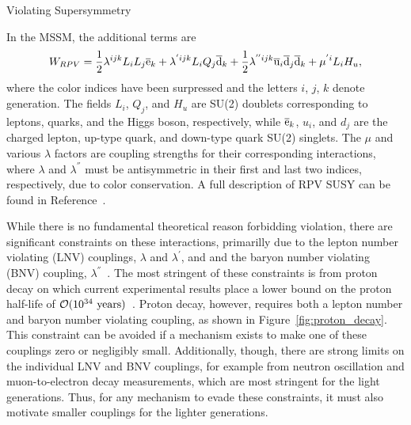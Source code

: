 \begin{section}{\RP Violating Supersymmetry}

In the MSSM, the additional \RPV terms are
\begin{align}
W_{RPV} = \frac{1}{2}\lambda^{ijk}L_{i}L_{j}\overline{\mathrm{e}}_{k} + \lambda^{'ijk}L_{i}Q_{j}\overline{\mathrm{d}}_{k} + \frac{1}{2}\lambda^{''ijk}\overline{\mathrm{u}}_{i}\overline{\mathrm{d}}_{j}\overline{\mathrm{d}}_{k} + \mu^{'i}L_{i}H_{u},
\end{align}
where the color indices have been surpressed and the letters $i$, $j$, $k$ denote generation.
The fields $L_{i}$, $Q_{j}$, and $H_u$ are SU(2) doublets corresponding to leptons, quarks, and the Higgs boson, respectively, while $\overline{\mathrm{e}}_k$, $u_i$, and $d_j$ are the charged lepton, up-type quark, and down-type quark SU(2) singlets.
The $\mu$ and various $\lambda$ factors are coupling strengths for their corresponding interactions, where $\lambda$ and $\lambda^{''}$ must be antisymmetric in their first and last two indices, respectively, due to color conservation.
A full description of RPV SUSY can be found in Reference~\cite{Barbier:2004ez}.

While there is no fundamental theoretical reason forbidding \RP violation, there are significant constraints on these interactions, primarilly due to the lepton number violating (LNV) couplings, $\lambda$ and $\lambda^{'}$, and and the baryon number violating (BNV) coupling, $\lambda^{''}$~\cite{Allanach:1999ic}.
The most stringent of these constraints is from proton decay on which current experimental results place a lower bound on the proton half-life of $\mathcal{O}(10^{34}\ \mrm{years})$~\cite{Bajc:2016qcc,Nishino:2009aa}.
Proton decay, however, requires both a lepton number and baryon number violating coupling, as shown in Figure~\ref{fig:proton_decay}.
This constraint can be avoided if a mechanism exists to make one of these couplings zero or negligibly small.
Additionally, though, there are strong limits on the individual LNV and BNV couplings, for example from neutron oscillation and muon-to-electron decay measurements, which are most stringent for the light generations.
Thus, for any mechanism to evade these constraints, it must also motivate smaller couplings for the lighter generations.


\end{section}
